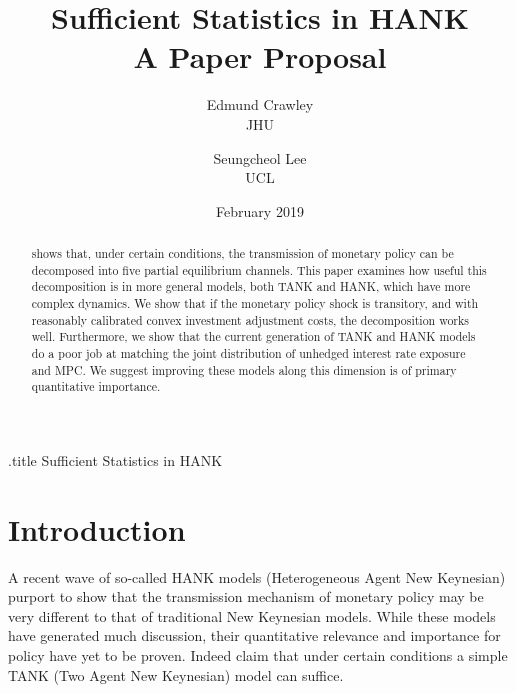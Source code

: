 \documentclass[titlepage]{\econtex}\newcommand{\texname}{ConsumptionHeterogeneity}
\begin{document}



\begin{verbatimwrite}{\jobname.title}
Sufficient Statistics in HANK
\end{verbatimwrite}


\title{ 
	\bigskip
	\bigskip
	Sufficient Statistics in HANK \\ A Paper Proposal}

\author{
  Edmund Crawley\authNum   \\ {\small JHU}
  \and
  Seungcheol Lee\authNum    \\ {\small UCL}
}


\keywords{}
\jelclass{}

\date{February 2019}
\maketitle


\begin{abstract}
\cite{auclert_monetary_2017} shows that, under certain conditions, the transmission of monetary policy can be decomposed into five partial equilibrium channels. This paper examines how useful this decomposition is in more general models, both TANK and HANK, which have more complex dynamics. We show that if the monetary policy shock is transitory, and with reasonably calibrated convex investment adjustment costs, the decomposition works well. Furthermore, we show that the current generation of TANK and HANK models do a poor job at matching the joint distribution of unhedged interest rate exposure and MPC. We suggest improving these models along this dimension is of primary quantitative importance.
\end{abstract}


\begin{authorsinfo}
\end{authorsinfo}

\titlepagefinish
\setcounter{page}{1}

\pagebreak
\section{Introduction}
A recent wave of so-called HANK models (Heterogeneous Agent New Keynesian) purport to show that the transmission mechanism of monetary policy may be very different to that of traditional New Keynesian models. While these models have generated much discussion, their quantitative relevance and importance for policy have yet to be proven. Indeed \cite{dgHANKTANK} claim that under certain conditions a simple TANK (Two Agent New Keynesian) model can suffice.
\end{document}
